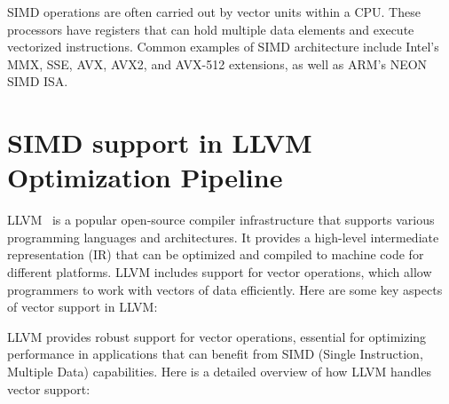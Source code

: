 SIMD operations are often carried out by vector units within a CPU.
These processors have registers that can hold multiple data elements
and execute vectorized instructions.
%
Common examples of SIMD
architecture include Intel’s MMX, SSE, AVX, AVX2, and AVX-512
extensions, as well as ARM’s NEON SIMD ISA.


\section{SIMD support in LLVM Optimization Pipeline}
\label{sec:llvm-vectors}

LLVM~\cite{llvm} is a popular open-source compiler infrastructure that supports
various programming languages and architectures. It provides a
high-level intermediate representation (IR) that can be optimized and
compiled to machine code for different platforms. LLVM includes
support for vector operations, which allow programmers to work with
vectors of data efficiently. Here are some key aspects of vector
support in LLVM:

LLVM provides robust support for vector operations, essential for
optimizing performance in applications that can benefit from SIMD
(Single Instruction, Multiple Data) capabilities. Here is a detailed
overview of how LLVM handles vector support:

